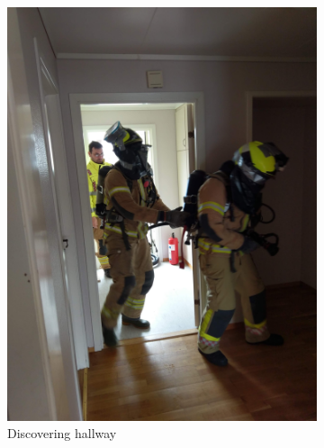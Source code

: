 \documentclass[../Main/thesis.tex]{subfiles}
\begin{document}
\begin{figure}[h]
\begin{subfigure}[t]{0.23\textwidth}
		\includegraphics[width=\textwidth]{../fig/dive3}
		\caption{Discovering hallway}
		\label{fig:eval-dive3}
	\end{subfigure}
	\begin{subfigure}[t]{0.23\textwidth}
		\vskip 0pt

\end{subfigure}
\end{figure}
\end{document}
